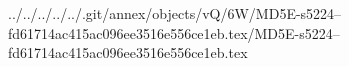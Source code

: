 ../../../../../.git/annex/objects/vQ/6W/MD5E-s5224--fd61714ac415ac096ee3516e556ce1eb.tex/MD5E-s5224--fd61714ac415ac096ee3516e556ce1eb.tex